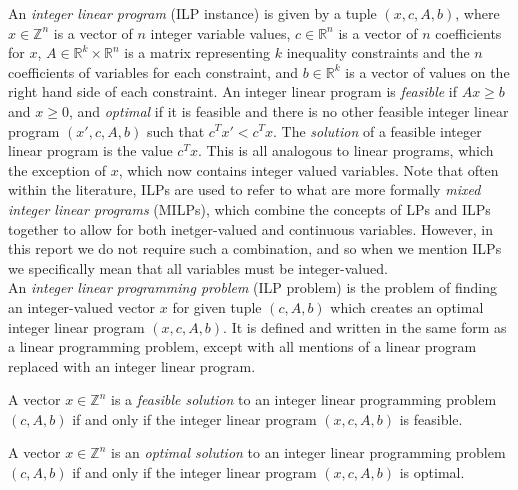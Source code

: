 An \textit{integer linear program} (ILP instance) is given by a tuple $(x,c,A,b)$, where $x\in \mathbb{Z}^n$ is a vector of $n$ integer variable values, $c\in \mathbb{R}^n$ is a vector of $n$ coefficients for $x$, $A\in\mathbb{R}^k\times\mathbb{R}^n$ is a matrix representing $k$ inequality constraints and the $n$ coefficients of variables for each constraint, and $b\in \mathbb{R}^k$ is a vector of values on the right hand side of each constraint. An integer linear program is \textit{feasible} if $Ax\geq b$ and $x\geq 0$, and \textit{optimal} if it is feasible and there is no other feasible integer linear program $(x',c,A,b)$ such that $c^Tx'<c^Tx$. The \textit{solution} of a feasible integer linear program is the value  $c^Tx$. This is all analogous to linear programs, which the exception of $x$, which now contains integer valued variables. Note that often within the literature, ILPs are used to refer to what are more formally \textit{mixed integer linear programs} (MILPs), which combine the concepts of LPs and ILPs together to allow for both inetger-valued and continuous variables. However, in this report we do not require such a combination, and so when we mention ILPs we specifically mean that all variables must be integer-valued.\\

An \textit{integer linear programming problem} (ILP problem) is the problem of finding an integer-valued vector $x$ for given tuple $(c,A,b)$ which creates an optimal integer linear program $(x,c,A,b)$. It is defined and written in the same form as a linear programming problem, except with all mentions of a linear program replaced with an integer linear program.

\begin{definition}
    A vector $x\in \mathbb{Z}^n$ is a \textit{feasible solution} to an integer linear programming problem $(c,A,b)$ if and only if the integer linear program $(x,c,A,b)$ is feasible.
\end{definition}

\begin{definition}
    A vector $x\in \mathbb{Z}^n$ is an \textit{optimal solution} to an integer linear programming problem $(c,A,b)$ if and only if the integer linear program $(x,c,A,b)$ is optimal.
\end{definition}

